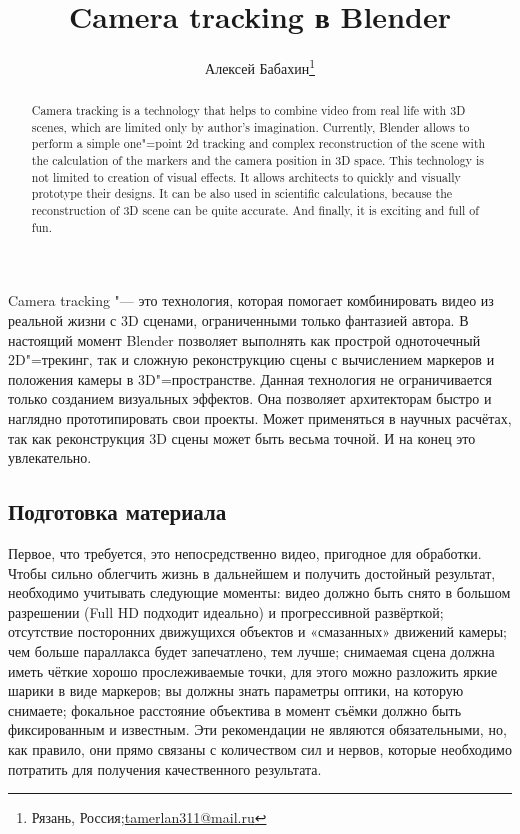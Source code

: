 \documentclass[10pt, a5paper]{article}
\begin{document}
\title{Camera tracking в Blender }%

\author{Алексей Бабахин\footnote{Рязань, Россия;\url{tamerlan311@mail.ru}}}
\maketitle

\begin{abstract}
Camera tracking is a technology that helps to combine video from real life with 3D scenes, which are limited only by author's imagination. Currently, Blender allows to perform a simple one"=point 2d tracking and complex reconstruction of the scene with the calculation of the markers and the camera position in 3D space. 
This technology is not limited to creation of visual effects. It allows architects to quickly and visually prototype their designs. It can be  also used in scientific calculations, because the \linebreak reconstruction of 3D scene can be quite accurate. And finally, it is exciting and full of fun.
\end{abstract}

Camera tracking "--- это технология, которая помогает комбинировать видео из реальной жизни с 3D сценами, ограниченными только фантазией автора. В настоящий момент Blender позволяет выполнять как прострой одноточечный 2D"=трекинг, так и сложную реконструкцию сцены с вычислением маркеров и положения камеры в 3D"=пространстве. Данная технология не ограничивается только созданием визуальных эффектов. Она позволяет архитекторам быстро и наглядно прототипировать свои проекты. Может применяться в научных расчётах, так как реконструкция 3D сцены может быть весьма точной. И на конец это увлекательно.

\subsection*{Подготовка материала}

Первое, что требуется, это непосредственно видео, пригодное для обработки. Чтобы сильно облегчить жизнь в дальнейшем и получить достойный результат, необходимо учитывать следующие моменты: видео должно быть снято в большом разрешении (Full HD подходит идеально) и прогрессивной развёрткой; отсутствие посторонних движущихся объектов и «смазанных» движений камеры; чем больше параллакса будет запечатлено, тем лучше; снимаемая сцена должна иметь чёткие хорошо прослеживаемые точки, для этого можно разложить яркие шарики в виде маркеров; вы должны знать параметры оптики, на которую снимаете; фокальное расстояние объектива в момент съёмки должно быть фиксированным и известным. Эти рекомендации не являются обязательными, но, как правило, они прямо связаны с количеством сил и нервов, которые необходимо потратить для получения качественного результата.
\end{document}
